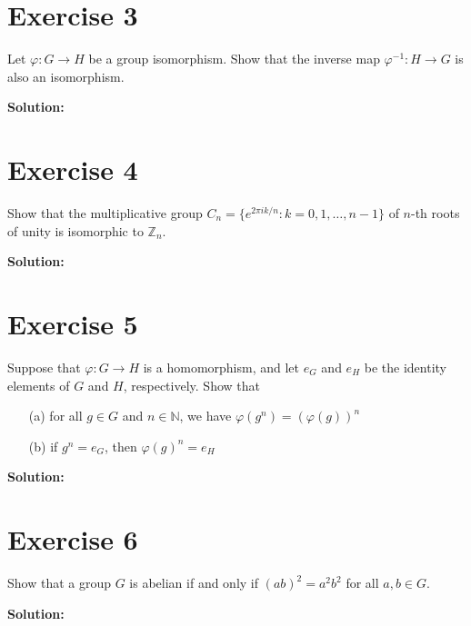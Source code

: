\documentclass{article}
\begin{document}
\newpage

\section*{Exercise 3}
Let $\varphi: G \to H$ be a group isomorphism. Show that the inverse map $\varphi^{-1}: H \to G$ is also an isomorphism.

\textbf{Solution:}
\newpage

\section*{Exercise 4}
Show that the multiplicative group $C_n = \{e^{2\pi i k/n} : k = 0,1,\ldots,n-1\}$ of $n$-th roots of unity is isomorphic to $\mathbb{Z}_n$.

\textbf{Solution:}
\newpage

\section*{Exercise 5}
Suppose that $\varphi: G \to H$ is a homomorphism, and let $e_G$ and $e_H$ be the identity elements of $G$ and $H$, respectively. Show that
\begin{itemize}
\item[(a)] for all $g \in G$ and $n \in \mathbb{N}$, we have $\varphi(g^n) = (\varphi(g))^n$
\item[(b)] if $g^n = e_G$, then $\varphi(g)^n = e_H$
\end{itemize}

\textbf{Solution:}
\newpage

\section*{Exercise 6}
Show that a group $G$ is abelian if and only if $(ab)^2 = a^2b^2$ for all $a,b \in G$.

\textbf{Solution:}
\end{document}
